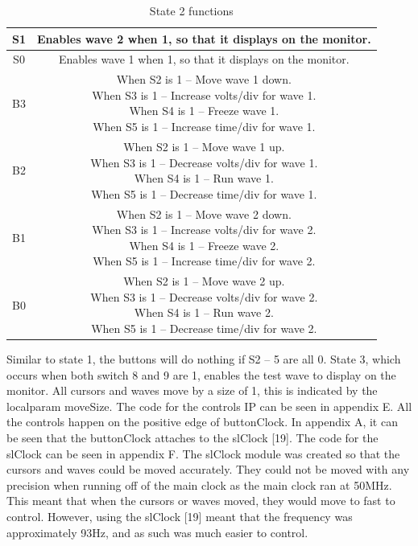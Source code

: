 \documentclass[a4paper,12pt]{article}
\newcommand{\squeezeup}{\vspace{-2.5mm}}
\begin{document}
\begin{flushleft}
\begin{center}
\begin{table}[H]
\begin{tabular}{|c|c|}
	\hline 
	S1 & Enables wave 2 when 1, so that it displays on the monitor.\\ 
	\hline 
	S0 & Enables wave 1 when 1, so that it displays on the monitor. \\ 
	\hline 
	B3 & \makecell{When S2 is 1 – Move wave 1 down.\\
When S3 is 1 – Increase volts/div for wave 1.\\
When S4 is 1 – Freeze wave 1.\\
When S5 is 1 – Increase time/div for wave 1.}
	 \\ 
	\hline 
	B2 & \makecell{When S2 is 1 – Move wave 1 up.\\
When S3 is 1 – Decrease volts/div for wave 1.\\
When S4 is 1 – Run wave 1.\\
When S5 is 1 – Decrease time/div for wave 1.}
	 \\ 
	\hline 
	B1 & \makecell{When S2 is 1 – Move wave 2 down.\\
When S3 is 1 – Increase volts/div for wave 2.\\
When S4 is 1 – Freeze wave 2.\\
When S5 is 1 – Increase time/div for wave 2.\\
} \\
	\hline 
	B0 & \makecell{When S2 is 1 – Move wave 2 up.\\
When S3 is 1 – Decrease volts/div for wave 2.\\
When S4 is 1 – Run wave 2.\\
When S5 is 1 – Decrease time/div for wave 2.\\
}
	 \\ 
	\hline 
	\end{tabular} 
	\caption{State 2 functions}
\end{table}
\end{center}
\squeezeup
Similar to state 1, the buttons will do nothing if S2 – 5 are all 0. State 3, which occurs when both switch 8 and 9 are 1, enables the test wave to display on the monitor. All cursors and waves move by a size of 1, this is indicated by the localparam moveSize. 
The code for the controls IP can be seen in appendix E. All the controls happen on the positive edge of buttonClock. In appendix A, it can be seen that the buttonClock attaches to the slClock [19]. The code for the slClock can be seen in appendix F. The slClock module was created so that the cursors and waves could be moved accurately. They could not be moved with any precision when running off of the main clock as the main clock ran at 50MHz. This meant that when the cursors or waves moved, they would move to fast to control. However, using the slClock [19] meant that the frequency was approximately 93Hz, and as such was much easier to control.
\end{flushleft}
\newpage
\end{document}
